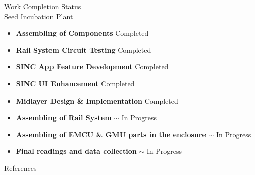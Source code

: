 \documentclass{beamer}
\begin{document}
\begin{frame}{Work Completion Status \\ Seed Incubation Plant}

	\begin{itemize}
	    \item \textbf{Assembling of Components} \hfill \textcolor{green!70!black}{\checkmark Completed}
	    \vspace{2pt}
	    
	    \item \textbf{Rail System Circuit Testing} \hfill \textcolor{green!70!black}{\checkmark Completed}
	    \vspace{2pt}
	    
	    \item \textbf{SINC App Feature Development} \hfill \textcolor{green!70!black}{\checkmark Completed}
	    \vspace{2pt}
	    
	    \item \textbf{SINC UI Enhancement} \hfill \textcolor{green!70!black}{\checkmark Completed}
	    \vspace{2pt}
	    
	    \item \textbf{Midlayer Design \& Implementation} \hfill \textcolor{green!70!black}{\checkmark Completed}
              \vspace{2pt}
              \item \textbf{Assembling of Rail System} \hfill \textcolor{orange!80!black}{\(\sim\) In Progress}
	    \vspace{2pt}
              \item \textbf{Assembling of EMCU \& GMU parts in the enclosure } \hfill \textcolor{orange!80!black}{\(\sim\) In Progress}
	    \vspace{2pt}
              \item \textbf{Final readings and data collection } \hfill \textcolor{orange!80!black}{\(\sim\) In Progress}
	    \vspace{2pt}
	\end{itemize}


\end{frame}

\begin{frame}[allowframebreaks] {References}

    \nocite{interEsp, ieeeComp, ieeeGreenAI, tinymlEnv, ieee01africa, microclimate, fruitfly, espGreen, ieee02, tinyml2}

    \nopagebreak

    \begingroup \let\clearpage\relax
    \printbibliography[heading = none] %
    \endgroup

\end{frame}
\end{document}
